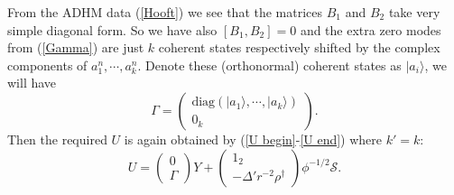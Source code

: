 \documentclass[a4paper,a4paper]{article}
\begin{document}
From the ADHM data (\ref{Hooft}) we see that the matrices $B_1$
and $B_2$ take very simple diagonal form. So we have also
$[B_1,B_2]=0$ and the extra zero modes from (\ref{Gamma}) are just
$k$ coherent states respectively shifted by the complex components
of $a_1^n,\cdots,a_k^n$. Denote these (orthonormal) coherent
states as $|a_i\rangle$, we will have
\begin{equation}
\Gamma=\left(\begin{array}{c}
\mathrm{diag}(|a_1\rangle,\cdots,|a_k\rangle) \\ 0_k
\end{array}\right).
\end{equation}
Then the required $U$ is again obtained by (\ref{U begin}-\ref{U
end}) where $k'=k$:
\begin{equation}
U=\left(\begin{array}{c}
0 \\ \Gamma
\end{array}\right)Y+\left(\begin{array}{c}
1_2 \\
-\Delta'r^{-2}\rho^\dag
\end{array}\right)\phi^{-1/2}\mathcal{S}.
\end{equation}
\end{document}
